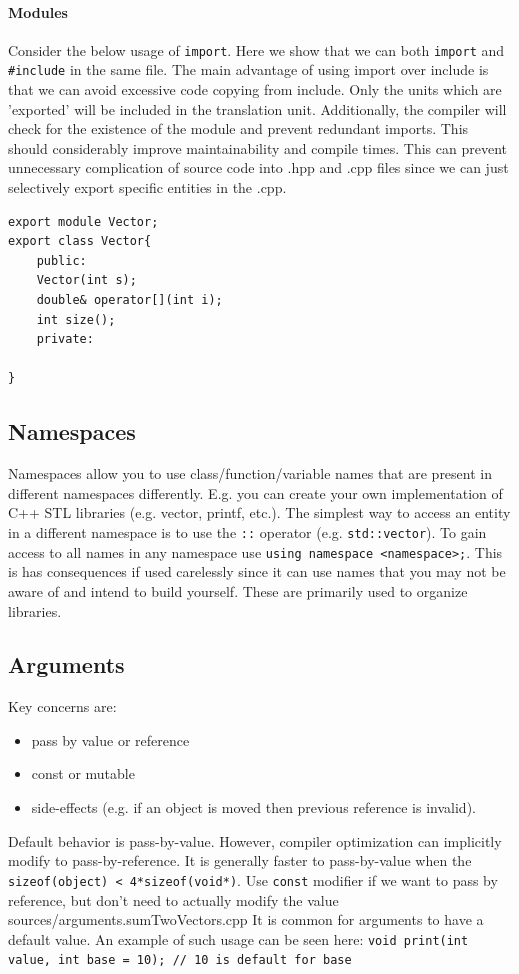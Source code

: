 \documentclass[a4paper, 10pt]{article}
\begin{document}
\paragraph{Modules}
Consider the below usage of \verb!import!. Here we show that we can both \verb!import! and \verb!#include! in the same file. The main advantage of using import over include is that we can avoid excessive code copying from include. Only the units which are 'exported' will be included in the translation unit. Additionally, the compiler will check for the existence of the module and prevent redundant imports. This should considerably improve maintainability and compile times. This can prevent unnecessary complication of source code into .hpp and .cpp files since we can just selectively export specific entities in the .cpp.

\begin{lstlisting}[style=cpp]
export module Vector;
export class Vector{
    public:
    Vector(int s);
    double& operator[](int i);
    int size();
    private:

}
\end{lstlisting}
\subsection{Namespaces}
Namespaces allow you to use class/function/variable names that are present in different namespaces differently. E.g. you can create your own implementation of C++ STL libraries (e.g. vector, printf, etc.). The simplest way to access an entity in a different namespace is to use the \verb!::! operator (e.g. \verb!std::vector!). To gain access to all names in any namespace use \verb!using namespace <namespace>;!. This is has consequences if used carelessly since it can use names that you may not be aware of and intend to build yourself. These are primarily used to organize libraries.
\subsection{Arguments}
Key concerns are:
\begin{itemize}
	\item pass by value or reference
	\item const or mutable
	\item side-effects (e.g. if an object is moved then previous reference is invalid).
\end{itemize}
Default behavior is pass-by-value. However, compiler optimization can implicitly modify to pass-by-reference. It is generally faster to pass-by-value when the \verb!sizeof(object) < 4*sizeof(void*)!. Use \verb!const! modifier if we want to pass by reference, but don't need to actually modify the value
 {sources/arguments.sumTwoVectors.cpp}
It is common for arguments to have a default value. An example of such usage can be seen here:\newline
\verb!void print(int value, int base = 10); // 10 is default for base!
\end{document}
